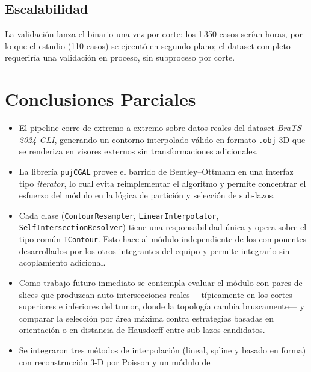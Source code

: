 \documentclass[conference]{IEEEtran}
\begin{document}
\subsection{Escalabilidad}
\label{sec:decisiones:escala}
La validación lanza el binario una vez por corte: los 1\,350 casos serían
horas, por lo que el estudio (110 casos) se ejecutó en segundo plano; el
dataset completo requeriría una validación en proceso, sin subproceso por
corte.

\section{Conclusiones Parciales}
\label{sec:conclusiones}
\begin{itemize}
  \item El pipeline corre de extremo a extremo sobre datos
        reales del dataset \textit{BraTS 2024 GLI}, generando
        un contorno interpolado válido en formato
        \texttt{.obj} 3D que se renderiza en visores externos
        sin transformaciones adicionales.
  \item La librería \texttt{pujCGAL} provee el barrido de
        Bentley--Ottmann en una interfaz tipo \emph{iterator},
        lo cual evita reimplementar el algoritmo y permite
        concentrar el esfuerzo del módulo en la lógica de
        partición y selección de sub-lazos.
  \item Cada clase (\texttt{ContourResampler},
        \texttt{LinearInterpolator},
        \texttt{SelfIntersectionResolver}) tiene una
        responsabilidad única y opera sobre el tipo común
        \texttt{TContour}. Esto hace al módulo independiente
        de los componentes desarrollados por los otros
        integrantes del equipo y permite integrarlo sin
        acoplamiento adicional.
  \item Como trabajo futuro inmediato se contempla evaluar el
        módulo con pares de slices que produzcan
        auto-intersecciones reales ---típicamente en los
        cortes superiores e inferiores del tumor, donde la
        topología cambia bruscamente--- y comparar la
        selección por área máxima contra estrategias basadas
        en orientación o en distancia de Hausdorff entre
        sub-lazos candidatos.
  \item Se integraron tres métodos de interpolación (lineal, spline y
        basado en forma) con reconstrucción 3-D por Poisson y un módulo de

\end{itemize}
\end{document}
